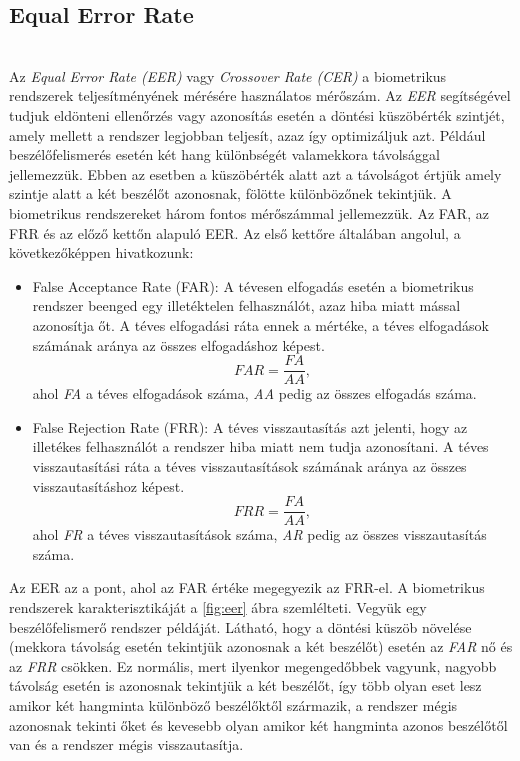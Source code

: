 \subsection{Equal Error Rate}
\ \\
Az \emph{Equal Error Rate (EER)} vagy \emph{Crossover Rate (CER)} a biometrikus rendszerek teljesítményének mérésére használatos mérőszám. Az \emph{EER} segítségével tudjuk eldönteni ellenőrzés vagy azonosítás esetén a döntési küszöbérték szintjét, amely mellett a rendszer legjobban teljesít, azaz így optimizáljuk azt. Például beszélőfelismerés esetén két hang különbségét valamekkora távolsággal jellemezzük. Ebben az esetben a küszöbérték alatt azt a távolságot értjük amely szintje alatt a két beszélőt azonosnak, fölötte különbözőnek tekintjük.
\newline
\newline
A biometrikus rendszereket három fontos mérőszámmal jellemezzük. Az FAR, az FRR és az előző kettőn alapuló EER. Az első kettőre általában angolul, a következőképpen hivatkozunk:
\begin{itemize}
	\item False Acceptance Rate (FAR): A tévesen elfogadás esetén a biometrikus rendszer beenged egy illetéktelen felhasználót, azaz hiba miatt mással azonosítja őt. A téves elfogadási ráta ennek a mértéke, a téves elfogadások számának aránya az összes elfogadáshoz képest.
	$$FAR = \frac{FA}{AA},$$
	ahol \emph{FA} a téves elfogadások száma, \emph{AA} pedig az összes elfogadás száma.
	\item False Rejection Rate (FRR): A téves visszautasítás azt jelenti, hogy az illetékes felhasználót a rendszer hiba miatt nem tudja azonosítani. A téves visszautasítási ráta a téves visszautasítások számának aránya az összes visszautasításhoz képest.
	$$FRR = \frac{FA}{AA},$$
	ahol \emph{FR} a téves visszautasítások száma, \emph{AR} pedig az összes visszautasítás száma.
\end{itemize}
Az EER az a pont, ahol az FAR értéke megegyezik az FRR-el.
\newline
\newline
A biometrikus rendszerek karakterisztikáját a \ref{fig:eer} ábra szemlélteti. Vegyük egy beszélőfelismerő rendszer példáját. Látható, hogy a döntési küszöb növelése (mekkora távolság esetén tekintjük azonosnak a két beszélőt) esetén az \emph{FAR} nő és az \emph{FRR} csökken. Ez normális, mert ilyenkor megengedőbbek vagyunk, nagyobb távolság esetén is azonosnak tekintjük a két beszélőt, így több olyan eset lesz amikor két hangminta különböző beszélőktől származik, a rendszer mégis azonosnak tekinti őket és kevesebb olyan amikor két hangminta azonos beszélőtől van és a rendszer mégis visszautasítja. 

